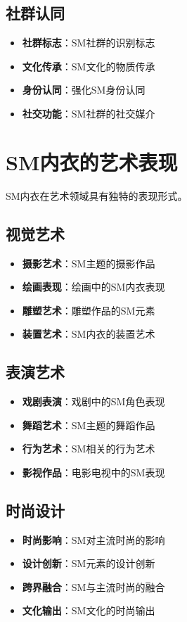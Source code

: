 \documentclass[12pt,UTF8]{ctexbook}
\begin{document}
\subsection{社群认同}
\begin{itemize}[leftmargin=2cm]
	\item \textbf{社群标志}：SM社群的识别标志
	\item \textbf{文化传承}：SM文化的物质传承
	\item \textbf{身份认同}：强化SM身份认同
	\item \textbf{社交功能}：SM社群的社交媒介
\end{itemize}

\section{SM内衣的艺术表现}
SM内衣在艺术领域具有独特的表现形式。

\subsection{视觉艺术}
\begin{itemize}[leftmargin=2cm]
	\item \textbf{摄影艺术}：SM主题的摄影作品
	\item \textbf{绘画表现}：绘画中的SM内衣表现
	\item \textbf{雕塑艺术}：雕塑作品的SM元素
	\item \textbf{装置艺术}：SM内衣的装置艺术
\end{itemize}

\subsection{表演艺术}
\begin{itemize}[leftmargin=2cm]
	\item \textbf{戏剧表演}：戏剧中的SM角色表现
	\item \textbf{舞蹈艺术}：SM主题的舞蹈作品
	\item \textbf{行为艺术}：SM相关的行为艺术
	\item \textbf{影视作品}：电影电视中的SM表现
\end{itemize}

\subsection{时尚设计}
\begin{itemize}[leftmargin=2cm]
	\item \textbf{时尚影响}：SM对主流时尚的影响
	\item \textbf{设计创新}：SM元素的设计创新
	\item \textbf{跨界融合}：SM与主流时尚的融合
	\item \textbf{文化输出}：SM文化的时尚输出
\end{itemize}
\end{document}
